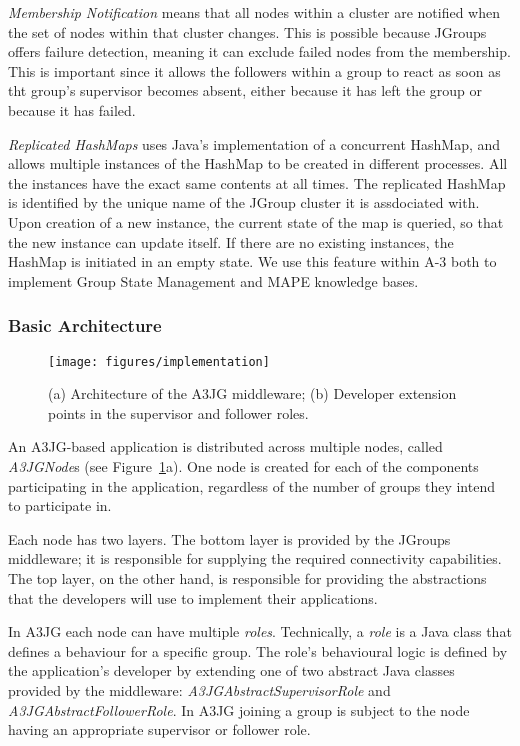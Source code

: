 \emph{Membership Notification} means that all nodes within a cluster are notified when the set of nodes within that cluster changes. This is possible because JGroups offers failure detection, meaning it can exclude failed nodes from the membership. This is important since it allows the followers within a group to react as soon as tht group's supervisor becomes absent, either because it has left the group or because it has failed. 

\emph{Replicated HashMaps} uses Java's implementation of a concurrent HashMap, and allows multiple instances of the HashMap to be created in different processes. All the instances have the exact same contents at all times. The replicated HashMap is identified by the unique name of the JGroup cluster it is assdociated with. Upon creation of a new instance, the current state of the map is queried, so that the new instance can update itself. If there are no existing instances, the HashMap is initiated in an empty state. We use this feature within A-3 both to implement Group State Management and MAPE knowledge bases. 

\subsubsection{Basic Architecture} %
\label{subsub:basic_architecture}

\begin{figure}[thb]
	\begin{center}
		\texttt{[image: figures/implementation]}
	\end{center}
	\caption{(a) Architecture of the A3JG middleware; (b) Developer extension points in the supervisor and follower roles.}
	\label{fig:implementation}
\end{figure}

An A3JG-based application is distributed across multiple nodes, called \emph{A3JGNode}s (see Figure~\ref{fig:implementation}a). One node is created for each of the components participating in the application, regardless of the number of groups they intend to participate in. 

Each node has two layers. The bottom layer is provided by the JGroups middleware; it is responsible for supplying the required connectivity capabilities. The top layer, on the other hand, is responsible for providing the abstractions that the developers will use to implement their applications. 

In A3JG each node can have multiple \emph{roles}. Technically, a \emph{role} is a Java class that defines a behaviour for a specific group. The role's behavioural logic is defined by the application's developer by extending one of two abstract Java classes provided by the middleware: \emph{A3JGAbstractSupervisorRole} and \emph{A3JGAbstractFollowerRole}. In A3JG joining a group is subject to the node having an appropriate supervisor or follower role.

